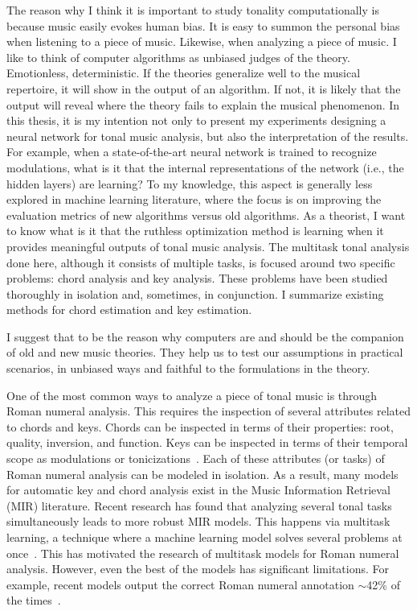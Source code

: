 The reason why I think it is important to study tonality
computationally is because music easily evokes human bias.
It is easy to summon the personal bias when listening to a
piece of music. Likewise, when analyzing a piece of music. I
like to think of computer algorithms as unbiased judges of
the theory. Emotionless, deterministic. If the theories
generalize well to the musical repertoire, it will show in
the output of an algorithm. If not, it is likely that the
output will reveal where the theory fails to explain the
musical phenomenon. In this thesis, it is my intention not
only to present my experiments designing a neural network
for tonal music analysis, but also the interpretation of the
results. For example, when a state-of-the-art neural network
is trained to recognize modulations, what is it that the
internal representations of the network (i.e., the hidden
layers) are learning? To my knowledge, this aspect is
generally less explored in machine learning literature,
where the focus is on improving the evaluation metrics of
new algorithms versus old algorithms. As a theorist, I want
to know what is it that the ruthless optimization method is
learning when it provides meaningful outputs of tonal music
analysis. The multitask tonal analysis done here, although
it consists of multiple tasks, is focused around two
specific problems: chord analysis and key analysis. These
problems have been studied thoroughly in isolation and,
sometimes, in conjunction. I summarize existing methods for
chord estimation and key estimation.


I suggest that to be the reason why computers are and should
be the companion of old and new music theories. They help us
to test our assumptions in practical scenarios, in unbiased
ways and faithful to the formulations in the theory.

One of the most common ways to analyze a piece of tonal
music is through Roman numeral analysis. This requires the
inspection of several attributes related to chords and keys.
Chords can be inspected in terms of their properties: root,
quality, inversion, and function. Keys can be inspected in
terms of their temporal scope as modulations or
tonicizations~\parencite{napoleslopez2020local}. Each of
these attributes (or tasks) of Roman numeral analysis can be
modeled in isolation. As a result, many models for automatic
key and chord analysis exist in the Music Information
Retrieval (MIR) literature. Recent research has found that
analyzing several tonal tasks simultaneously leads to more
robust MIR models. This happens via multitask learning, a
technique where a machine learning model solves several
problems at once~\parencite{ruder2017overview}. This has
motivated the research of multitask models for Roman numeral
analysis. However, even the best of the models has
significant limitations. For example, recent models output
the correct Roman numeral annotation $\sim$42\% of the
times~\parencite{chen2021attend, micchi2020not}.


